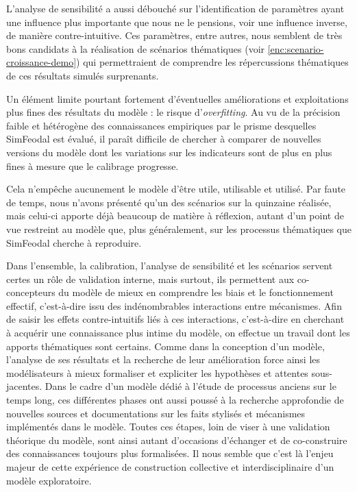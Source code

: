 L'analyse de sensibilité a aussi débouché sur l'identification de paramètres ayant une influence plus importante que nous ne le pensions, voir une influence inverse, de manière contre-intuitive.
Ces paramètres, entre autres, nous semblent de très bons candidats à la réalisation de scénarios thématiques (voir \cref{enc:scenario-croissance-demo}) qui permettraient de comprendre les répercussions thématiques de ces résultats simulés surprenants.

Un élément limite pourtant fortement d'éventuelles améliorations et exploitations plus fines des résultats du modèle : le risque d'\textit{overfitting}.
Au vu de la précision faible et hétérogène des connaissances empiriques par le prisme desquelles SimFeodal est évalué, il paraît difficile de chercher à comparer de nouvelles versions du modèle dont les variations sur les indicateurs sont de plus en plus fines à mesure que le calibrage progresse.

Cela n'empêche aucunement le modèle d'être utile, utilisable et utilisé.
Par faute de temps, nous n'avons présenté qu'un des scénarios sur la quinzaine réalisée, mais celui-ci apporte déjà beaucoup de matière à réflexion, autant d'un point de vue restreint au modèle que, plus généralement, sur les processus thématiques que SimFeodal cherche à reproduire.

Dans l'ensemble, la calibration, l'analyse de sensibilité et les scénarios servent certes un rôle de validation interne, mais surtout, ils permettent aux co-concepteurs du modèle de mieux en comprendre les biais et le fonctionnement effectif, c'est-à-dire issu des indénombrables interactions entre mécanismes.
Afin de saisir les effets contre-intuitifs liés à ces interactions, c'est-à-dire en cherchant à acquérir une connaissance plus intime du modèle, on effectue un travail dont les apports thématiques sont certains.
Comme dans la conception d'un modèle, l'analyse de ses résultats et la recherche de leur amélioration force ainsi les modélisateurs à mieux formaliser et expliciter les hypothèses et attentes sous-jacentes.
Dans le cadre d'un modèle dédié à l'étude de processus anciens sur le temps long, ces différentes phases ont aussi poussé à la recherche approfondie de nouvelles sources et documentations sur les faits stylisés et mécanismes implémentés dans le modèle.
Toutes ces étapes, loin de viser à une validation théorique du modèle, sont ainsi autant d'occasions d'échanger et de co-construire des connaissances toujours plus formalisées.
Il nous semble que c'est là l'enjeu majeur de cette expérience de construction collective et interdisciplinaire d'un modèle exploratoire.
